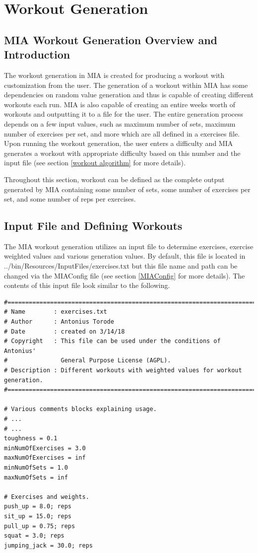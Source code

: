 \chapter{Workout Generation} \label{workout}
\pagestyle{fancy}

\section{MIA Workout Generation Overview and Introduction}

The workout generation in MIA is created for producing a workout with customization from the user. The generation of a workout within MIA has some dependencies on random value generation and thus is capable of creating different workouts each run. MIA is also capable of creating an entire weeks worth of workouts and outputting it to a file for the user. The entire generation process depends on a few input values, such as maximum number of sets, maximum number of exercises per set, and more which are all defined in a exercises file. Upon running the workout generation, the user enters a difficulty and MIA generates a workout with appropriate difficulty based on this number and the input file (see section \ref{workout algorithm} for more details).  

Throughout this section, workout can be defined as the complete output generated by MIA containing some number of sets, some number of exercises per set, and some number of reps per exercises.

\section{Input File and Defining Workouts}

The MIA workout generation utilizes an input file to determine exercises, exercise weighted values and various generation values. By default, this file is located in ../bin/Resources/InputFiles/exercises.txt but this file name and path can be changed via the MIAConfig file (see section \ref{MIAConfig} for more details). The contents of this input file look similar to the following.

\lstset{language=Python}

\begin{lstlisting}
#============================================================================
# Name        : exercises.txt
# Author      : Antonius Torode
# Date        : created on 3/14/18
# Copyright   : This file can be used under the conditions of Antonius' 
#               General Purpose License (AGPL).
# Description : Different workouts with weighted values for workout generation.
#============================================================================

# Various comments blocks explaining usage.
# ...
# ...
toughness = 0.1
minNumOfExercises = 3.0
maxNumOfExercises = inf
minNumOfSets = 1.0
maxNumOfSets = inf

# Exercises and weights.
push_up = 8.0; reps
sit_up = 15.0; reps
pull_up = 0.75; reps
squat = 3.0; reps
jumping_jack = 30.0; reps
\end{lstlisting}

